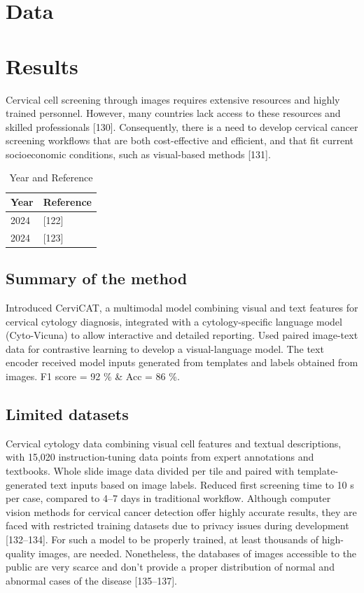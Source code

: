 \documentclass{svjour3}
\begin{document}
\section{Data}
\section{Results}
Cervical cell screening through images requires extensive resources and highly trained personnel. However, many countries lack access to these resources and skilled professionals [130]. Consequently, there is a need to develop cervical cancer screening workflows that are both cost-effective and efficient, and that fit current socioeconomic conditions, such as visual-based methods [131].
\begin{table}[htbp]
\centering
\caption{Year and Reference}
\label{tab:yearref}
\begin{tabular}{ll}
\hline
Year & Reference \\
\hline
2024 & [122] \\
2024 & [123] \\
\hline
\end{tabular}
\end{table}
\subsection{Summary of the method}
Introduced CerviCAT, a multimodal model combining visual and text features for cervical cytology diagnosis, integrated with a cytology-specific language model (Cyto-Vicuna) to allow interactive and detailed reporting.
Used paired image-text data for contrastive learning to develop a visual-language model. The text encoder received model inputs generated from templates and labels obtained from images.
F1 score = 92 \% \& Acc = 86 \%.
\subsection{Limited datasets}
Cervical cytology data combining visual cell features and textual descriptions, with 15,020 instruction-tuning data points from expert annotations and textbooks.
Whole slide image data divided per tile and paired with template-generated text inputs based on image labels.
Reduced first screening time to 10 s per case, compared to 4--7 days in traditional workflow.
Although computer vision methods for cervical cancer detection offer highly accurate results, they are faced with restricted training datasets due to privacy issues during development [132--134]. For such a model to be properly trained, at least thousands of high-quality images, are needed. Nonetheless, the databases of images accessible to the public are very scarce and don’t provide a proper distribution of normal and abnormal cases of the disease [135--137].
\end{document}
